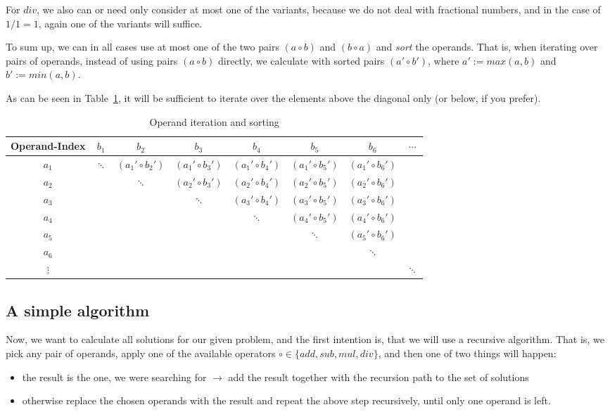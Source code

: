 \documentclass[english]{article}
\begin{document}
For $div$, we also can or need only consider at most one of the variants, because we do not deal with fractional numbers, and in the case of $1/1=1$, again one of the variants will suffice.

To sum up, we can in all cases use at most one of the two pairs $\left(a \circ b\right)$ and $\left(b \circ a\right)$ and \emph{sort} the operands. That is, when iterating over pairs of operands, instead of using pairs $(a \circ b)$ directly, we calculate with sorted pairs $(a' \circ b')$, where $a' := max \left(a, b\right)$ and $b' := min \left(a, b\right)$.

As can be seen in Table~\ref{table:operands}, it will be sufficient to iterate over the elements above the diagonal only (or below, if you prefer).

\begin{table}
\centering
\begin{tabular}{|c|c|c|c|c|c|c|c|}
	\hline
	Operand-Index & $b_1$ & $b_2$ & $b_3$ & $b_4$ & $b_5$ & $b_6$ & $\cdots$ \\
	\hline
	$a_1$ & $\ddots$ & $(a_1' \circ b_2')$ & $(a_1' \circ b_3')$ & $(a_1' \circ b_4')$ & $(a_1' \circ b_5')$ & $(a_1' \circ b_6')$ & \\
	\hline
	$a_2$ &  & $\ddots$ & $(a_2' \circ b_3')$ & $(a_2' \circ b_4')$ & $(a_2' \circ b_5')$ & $(a_2' \circ b_6')$ & \\
	\hline
	$a_3$ &  &  & $\ddots$ & $(a_3' \circ b_4')$ & $(a_3' \circ b_5')$ & $(a_3' \circ b_6')$ & \\
	\hline
	$a_4$ &  &  &  & $\ddots$ & $(a_4' \circ b_5')$ & $(a_4' \circ b_6')$ & \\
	\hline
	$a_5$ &  &  &  &  & $\ddots$ & $(a_5' \circ b_6')$ & \\
	\hline
	$a_6$ &  &  &  &  &  & $\ddots$ & \\
	\hline
	$\vdots$ &  &  &  &  & &  & $\ddots$ \\
	\hline
\end{tabular}
\caption{\label{table:operands} Operand iteration and sorting}
\end{table}

\subsection{A simple algorithm}

Now, we want to calculate all solutions for our given problem, and the first intention is, that we will use a recursive algorithm. That is, we pick any pair of operands, apply one of the available operators $\circ \in \lbrace add, sub, mul, div \rbrace$, and then one of two things will happen:
\begin{itemize}
	\item the result is the one, we were searching for $\rightarrow$ add the result together with the recursion path to the set of solutions
	\item otherwise replace the chosen operands with the result and repeat the above step recursively, until only one operand is left.
\end{itemize}
\end{document}
